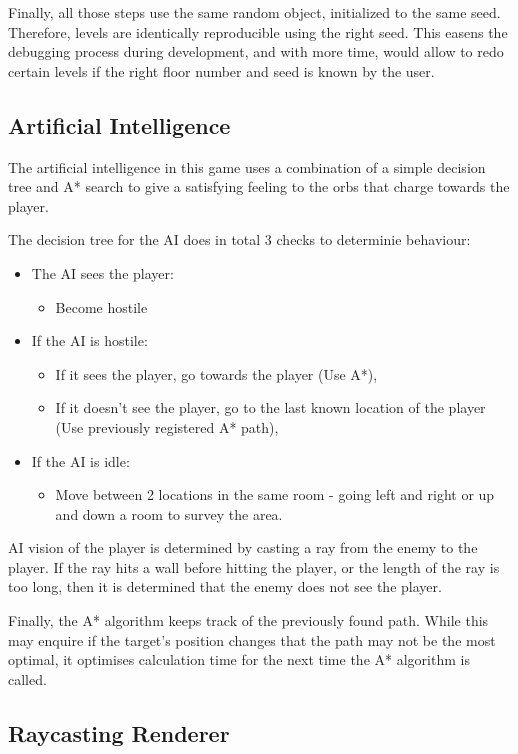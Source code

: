 \documentclass[11pt]{article}
\begin{document}
Finally, all those steps use the same random object, initialized to the same seed. Therefore, levels are identically
reproducible using the right seed. This easens the debugging process during development, and with more time, would allow
to redo certain levels if the right floor number and seed is known by the user.
\subsection{Artificial Intelligence}
\label{sec:org4612bd6}

The artificial intelligence in this game uses a combination of a simple decision tree and A* search to give
a satisfying feeling to the orbs that charge towards the player.

The decision tree for the AI does in total 3 checks to determinie behaviour:
\begin{itemize}
\item The AI sees the player:
\begin{itemize}
\item Become hostile
\end{itemize}
\item If the AI is hostile:
\begin{itemize}
\item If it sees the player, go towards the player (Use A*),
\item If it doesn't see the player, go to the last known location of the player (Use previously registered A* path),
\end{itemize}
\item If the AI is idle:
\begin{itemize}
\item Move between 2 locations in the same room - going left and right or up and down a room to survey the area.
\end{itemize}
\end{itemize}

AI vision of the player is determined by casting a ray from the enemy to the player. If the ray hits a wall before
hitting the player, or the length of the ray is too long, then it is determined that the enemy does not see the player.

Finally, the A* algorithm keeps track of the previously found path. While this may enquire if the target's position changes
that the path may not be the most optimal, it optimises calculation time for the next time the A* algorithm is called.

\subsection{Raycasting Renderer}
\label{sec:orgc2ced6c}
\end{document}
